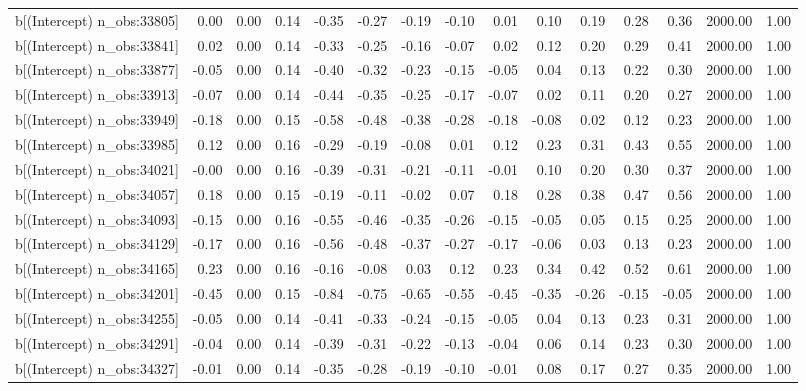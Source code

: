 \begin{table}[ht]
\begin{tabular}{rrrrrrrrrrrrrrr}
  b[(Intercept) n\_obs:33805] & 0.00 & 0.00 & 0.14 & -0.35 & -0.27 & -0.19 & -0.10 & 0.01 & 0.10 & 0.19 & 0.28 & 0.36 & 2000.00 & 1.00 \\ 
  b[(Intercept) n\_obs:33841] & 0.02 & 0.00 & 0.14 & -0.33 & -0.25 & -0.16 & -0.07 & 0.02 & 0.12 & 0.20 & 0.29 & 0.41 & 2000.00 & 1.00 \\ 
  b[(Intercept) n\_obs:33877] & -0.05 & 0.00 & 0.14 & -0.40 & -0.32 & -0.23 & -0.15 & -0.05 & 0.04 & 0.13 & 0.22 & 0.30 & 2000.00 & 1.00 \\ 
  b[(Intercept) n\_obs:33913] & -0.07 & 0.00 & 0.14 & -0.44 & -0.35 & -0.25 & -0.17 & -0.07 & 0.02 & 0.11 & 0.20 & 0.27 & 2000.00 & 1.00 \\ 
  b[(Intercept) n\_obs:33949] & -0.18 & 0.00 & 0.15 & -0.58 & -0.48 & -0.38 & -0.28 & -0.18 & -0.08 & 0.02 & 0.12 & 0.23 & 2000.00 & 1.00 \\ 
  b[(Intercept) n\_obs:33985] & 0.12 & 0.00 & 0.16 & -0.29 & -0.19 & -0.08 & 0.01 & 0.12 & 0.23 & 0.31 & 0.43 & 0.55 & 2000.00 & 1.00 \\ 
  b[(Intercept) n\_obs:34021] & -0.00 & 0.00 & 0.16 & -0.39 & -0.31 & -0.21 & -0.11 & -0.01 & 0.10 & 0.20 & 0.30 & 0.37 & 2000.00 & 1.00 \\ 
  b[(Intercept) n\_obs:34057] & 0.18 & 0.00 & 0.15 & -0.19 & -0.11 & -0.02 & 0.07 & 0.18 & 0.28 & 0.38 & 0.47 & 0.56 & 2000.00 & 1.00 \\ 
  b[(Intercept) n\_obs:34093] & -0.15 & 0.00 & 0.16 & -0.55 & -0.46 & -0.35 & -0.26 & -0.15 & -0.05 & 0.05 & 0.15 & 0.25 & 2000.00 & 1.00 \\ 
  b[(Intercept) n\_obs:34129] & -0.17 & 0.00 & 0.16 & -0.56 & -0.48 & -0.37 & -0.27 & -0.17 & -0.06 & 0.03 & 0.13 & 0.23 & 2000.00 & 1.00 \\ 
  b[(Intercept) n\_obs:34165] & 0.23 & 0.00 & 0.16 & -0.16 & -0.08 & 0.03 & 0.12 & 0.23 & 0.34 & 0.42 & 0.52 & 0.61 & 2000.00 & 1.00 \\ 
  b[(Intercept) n\_obs:34201] & -0.45 & 0.00 & 0.15 & -0.84 & -0.75 & -0.65 & -0.55 & -0.45 & -0.35 & -0.26 & -0.15 & -0.05 & 2000.00 & 1.00 \\ 
  b[(Intercept) n\_obs:34255] & -0.05 & 0.00 & 0.14 & -0.41 & -0.33 & -0.24 & -0.15 & -0.05 & 0.04 & 0.13 & 0.23 & 0.31 & 2000.00 & 1.00 \\ 
  b[(Intercept) n\_obs:34291] & -0.04 & 0.00 & 0.14 & -0.39 & -0.31 & -0.22 & -0.13 & -0.04 & 0.06 & 0.14 & 0.23 & 0.30 & 2000.00 & 1.00 \\ 
  b[(Intercept) n\_obs:34327] & -0.01 & 0.00 & 0.14 & -0.35 & -0.28 & -0.19 & -0.10 & -0.01 & 0.08 & 0.17 & 0.27 & 0.35 & 2000.00 & 1.00 \\ 

\end{tabular}
\end{table}
